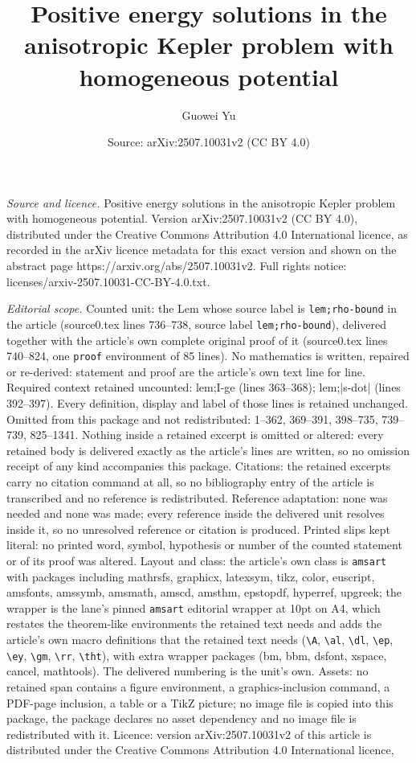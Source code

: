 \documentclass[10pt,a4paper]{amsart}
\title[Positive energy solutions in the anisotropic Kepler problem ]{Positive energy solutions in the anisotropic Kepler problem with homogeneous potential}
\author{Guowei Yu}
\date{Source: arXiv:2507.10031v2 (CC BY 4.0)}
\begin{document}
\maketitle

\noindent\emph{Source and licence.} Positive energy solutions in the anisotropic Kepler problem with homogeneous potential. Version arXiv:2507.10031v2 (CC BY 4.0), distributed under the Creative Commons Attribution 4.0 International licence, as recorded in the arXiv licence metadata for this exact version and shown on the abstract page https://arxiv.org/abs/2507.10031v2. Full rights notice: licenses/arxiv-2507.10031-CC-BY-4.0.txt.\par\smallskip

\noindent\textit{Editorial scope.} Counted unit: the Lem whose source label is \texttt{lem;rho-bound} in the article (source0.tex lines 736--738, source label \texttt{lem;rho-bound}), delivered together with the article's own complete original proof of it (source0.tex lines 740--824, one \texttt{proof} environment of 85 lines). No mathematics is written, repaired or re-derived: statement and proof are the article's own text line for line. Required context retained uncounted: lem;I-ge (lines 363--368); lem;|s-dot| (lines 392--397). Every definition, display and label of those lines is retained unchanged. Omitted from this package and not redistributed: 1--362, 369--391, 398--735, 739--739, 825--1341. Nothing inside a retained excerpt is omitted or altered: every retained body is delivered exactly as the article's lines are written, so no omission receipt of any kind accompanies this package. Citations: the retained excerpts carry no citation command at all, so no bibliography entry of the article is transcribed and no reference is redistributed. Reference adaptation: none was needed and none was made; every reference inside the delivered unit resolves inside it, so no unresolved reference or citation is produced. Printed slips kept literal: no printed word, symbol, hypothesis or number of the counted statement or of its proof was altered. Layout and class: the article's own class is \texttt{amsart} with packages including mathrsfs, graphicx, latexsym, tikz, color, euscript, amsfonts, amssymb, amsmath, amscd, amsthm, epstopdf, hyperref, upgreek; the wrapper is the lane's pinned \texttt{amsart} editorial wrapper at 10pt on A4, which restates the theorem-like environments the retained text needs and adds the article's own macro definitions that the retained text needs (\texttt{\textbackslash A}, \texttt{\textbackslash al}, \texttt{\textbackslash dl}, \texttt{\textbackslash ep}, \texttt{\textbackslash ey}, \texttt{\textbackslash gm}, \texttt{\textbackslash rr}, \texttt{\textbackslash tht}), with extra wrapper packages (bm, bbm, dsfont, xspace, cancel, mathtools). The delivered numbering is the unit's own. Assets: no retained span contains a figure environment, a graphics-inclusion command, a PDF-page inclusion, a table or a TikZ picture; no image file is copied into this package, the package declares no asset dependency and no image file is redistributed with it. Licence: version arXiv:2507.10031v2 of this article is distributed under the Creative Commons Attribution 4.0 International licence, 
\end{document}
